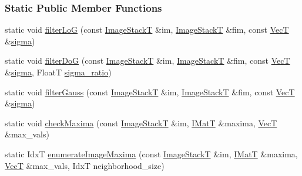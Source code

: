 \subsubsection*{Static Public Member Functions}
\begin{DoxyCompactItemize}
\item 
static void \hyperlink{classboxxer_1_1Boxxer3D_ad242333de1472fea719db9958dfe6f46}{filter\+LoG} (const \hyperlink{classboxxer_1_1Boxxer3D_aa17e25866089479e9b40ea01dfad8a88}{Image\+StackT} \&im, \hyperlink{classboxxer_1_1Boxxer3D_aa17e25866089479e9b40ea01dfad8a88}{Image\+StackT} \&fim, const \hyperlink{classboxxer_1_1Boxxer3D_a74e56a85bc18204a802bbf2a76eea61c}{VecT} \&\hyperlink{classboxxer_1_1Boxxer3D_a5df6b670e57ee7b6c2396650f6caba86}{sigma})
\item 
static void \hyperlink{classboxxer_1_1Boxxer3D_a523dff6ee90ba9f6e6bb0e8e4258a905}{filter\+DoG} (const \hyperlink{classboxxer_1_1Boxxer3D_aa17e25866089479e9b40ea01dfad8a88}{Image\+StackT} \&im, \hyperlink{classboxxer_1_1Boxxer3D_aa17e25866089479e9b40ea01dfad8a88}{Image\+StackT} \&fim, const \hyperlink{classboxxer_1_1Boxxer3D_a74e56a85bc18204a802bbf2a76eea61c}{VecT} \&\hyperlink{classboxxer_1_1Boxxer3D_a5df6b670e57ee7b6c2396650f6caba86}{sigma}, FloatT \hyperlink{classboxxer_1_1Boxxer3D_a63a9a0d9c56c11f34c7f2c80e0556335}{sigma\+\_\+ratio})
\item 
static void \hyperlink{classboxxer_1_1Boxxer3D_a210c289db79c6db6596df92d77052f47}{filter\+Gauss} (const \hyperlink{classboxxer_1_1Boxxer3D_aa17e25866089479e9b40ea01dfad8a88}{Image\+StackT} \&im, \hyperlink{classboxxer_1_1Boxxer3D_aa17e25866089479e9b40ea01dfad8a88}{Image\+StackT} \&fim, const \hyperlink{classboxxer_1_1Boxxer3D_a74e56a85bc18204a802bbf2a76eea61c}{VecT} \&\hyperlink{classboxxer_1_1Boxxer3D_a5df6b670e57ee7b6c2396650f6caba86}{sigma})
\item 
static void \hyperlink{classboxxer_1_1Boxxer3D_a44cf5445f8991f735207651fcb6d5962}{check\+Maxima} (const \hyperlink{classboxxer_1_1Boxxer3D_aa17e25866089479e9b40ea01dfad8a88}{Image\+StackT} \&im, \hyperlink{classboxxer_1_1Boxxer3D_a9b8cb89e1f1fbf091e5443876ca9a200}{I\+MatT} \&maxima, \hyperlink{classboxxer_1_1Boxxer3D_a74e56a85bc18204a802bbf2a76eea61c}{VecT} \&max\+\_\+vals)
\item 
static IdxT \hyperlink{classboxxer_1_1Boxxer3D_a2fbe5c1f5d3b705ddcca7d13a92f9283}{enumerate\+Image\+Maxima} (const \hyperlink{classboxxer_1_1Boxxer3D_aa17e25866089479e9b40ea01dfad8a88}{Image\+StackT} \&im, \hyperlink{classboxxer_1_1Boxxer3D_a9b8cb89e1f1fbf091e5443876ca9a200}{I\+MatT} \&maxima, \hyperlink{classboxxer_1_1Boxxer3D_a74e56a85bc18204a802bbf2a76eea61c}{VecT} \&max\+\_\+vals, IdxT neighborhood\+\_\+size)
\end{DoxyCompactItemize}
